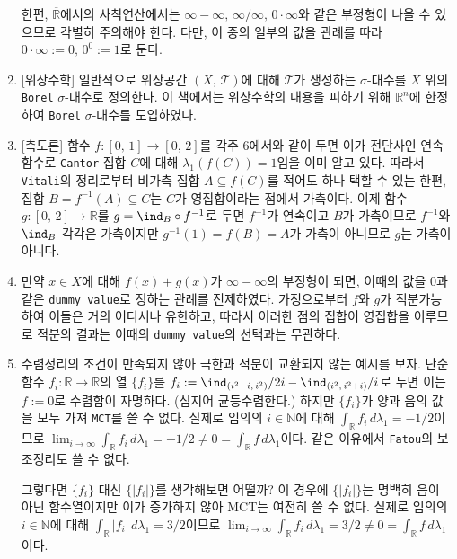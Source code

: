 \begin{enumerate}[label = \textsf{\textbf{\arabic*}}]
    한편, $\overline{\mathbb{R}}$에서의 사칙연산에서는 $\infty-\infty,\,\infty/\infty,\,0\cdot\infty$와 같은 부정형이 나올 수 있으므로 각별히 주의해야 한다. 다만, 이 중의 일부의 값을 관례를 따라 $0\cdot\infty:=0,\,0^0:=1$로 둔다.
    \item \textsf{[위상수학]} 일반적으로 위상공간 $(X,\,\mathcal{T})$에 대해 $\mathcal{T}$가 생성하는 $\sigma$-대수를 $X$ 위의 \texttt{Borel} $\sigma$-대수로 정의한다. 이 책에서는 위상수학의 내용을 피하기 위해 $\mathbb{R}^n$에 한정하여 \texttt{Borel} $\sigma$-대수를 도입하였다.
    \item \textsf{[측도론]} 함수 $f:[0,\,1]\to[0,\,2]$를 각주 6에서와 같이 두면 이가 전단사인 연속함수로 \texttt{Cantor} 집합 $C$에 대해 $\lambda_1(f(C))=1$임을 이미 알고 있다. 따라서 \texttt{Vitali}의 정리로부터 비가측 집합 $A\subseteq f(C)$를 적어도 하나 택할 수 있는 한편, 집합 $B=f^{-1}(A)\subseteq C$는 $C$가 영집합이라는 점에서 가측이다. 이제 함수 $g:[0,\,2]\to\mathbb{R}$를 $g=\ind_B\circ f^{-1}$로 두면 $f^{-1}$가 연속이고 $B$가 가측이므로 $f^{-1}$와 $\ind_B$ 각각은 가측이지만 $g^{-1}(1)=f(B)=A$가 가측이 아니므로 $g$는 가측이 아니다.
    \item 만약 $x\in X$에 대해 $f(x)+g(x)$가 $\infty-\infty$의 부정형이 되면, 이때의 값을 $0$과 같은 \texttt{dummy value}로 정하는 관례를 전제하였다. 가정으로부터 $f$와 $g$가 적분가능하여 이들은 거의 어디서나 유한하고, 따라서 이러한 점의 집합이 영집합을 이루므로 적분의 결과는 이때의 \texttt{dummy value}의 선택과는 무관하다.
    \item 수렴정리의 조건이 만족되지 않아 극한과 적분이 교환되지 않는 예시를 보자. 단순함수 $f_i:\mathbb{R}\to\mathbb{R}$의 열 $\{f_i\}$를 $f_i:=\ind_{(i^2-i,\,i^2)}/2i-\ind_{(i^2,\,i^2+i)}/i$로 두면 이는 $f:=0$로 수렴함이 자명하다. (심지어 균등수렴한다.) 하지만 $\{f_i\}$가 양과 음의 값을 모두 가져 \texttt{MCT}를 쓸 수 없다. 실제로 임의의 $i\in\mathbb{N}$에 대해 $\int_\mathbb{R}f_i\,d\lambda_1=-1/2$이므로 $\lim_{i\to\infty}\int_\mathbb{R}f_i\,d\lambda_1=-1/2\ne0=\int_\mathbb{R}f\,d\lambda_1$이다. 같은 이유에서 \texttt{Fatou}의 보조정리도 쓸 수 없다.

    그렇다면 $\{f_i\}$ 대신 $\{|f_i|\}$를 생각해보면 어떨까? 이 경우에 $\{|f_i|\}$는 명백히 음이 아닌 함수열이지만 이가 증가하지 않아 MCT는 여전히 쓸 수 없다. 실제로 임의의 $i\in\mathbb{N}$에 대해 $\int_\mathbb{R}|f_i|\,d\lambda_1=3/2$이므로 $\lim_{i\to\infty}\int_\mathbb{R}f_i\,d\lambda_1=3/2\ne0=\int_\mathbb{R}f\,d\lambda_1$이다.
    

\end{enumerate}

